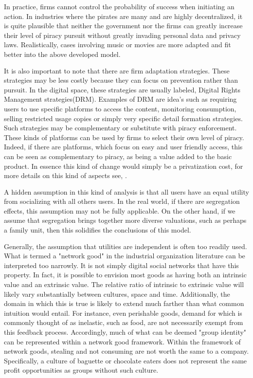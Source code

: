 In practice, firms cannot control the probability of success when initiating an action. In industries where the pirates are many and are highly decentralized, it is quite plausible that neither the government nor the firms can greatly increase their level of piracy pursuit without greatly invading personal data and privacy laws.  Realistically, cases involving music or movies are more adapted and fit better into the above developed model. 

It is also important to note that there are firm adaptation strategies. These strategies may be less costly because they can focus on prevention rather than pursuit. In the digital space, these strategies are usually labeled, Digital Rights Management strategies(DRM). Examples of DRM are idea's such as requiring users to use specific platforms to access the content, monitoring consumption, selling restricted usage copies or simply very specific detail formation strategies. Such strategies may be complementary or substitute with piracy enforcement. These kinds of platforms can be used by firms to select their own level of piracy. Indeed, if there are platforms, which focus on easy and user friendly access, this can be seen as complementary to piracy, as being a value added to the basic product. In essence this kind of change would simply be a privatization cost, for more details on this kind of aspects see,  \citep{S04}.


A hidden assumption in this kind of analysis is that all users have an equal utility from socializing with all others users. In the real world, if there are segregation effects, this assumption may not be fully applicable. On the other hand, if we assume that segregation brings together more diverse valuations, such as perhaps a family unit, then this solidifies the conclusions of this model.

Generally, the assumption that utilities are independent is often too readily used. What is termed a "network good" in the industrial organization literature can be interpreted too narrowly. It is not simply digital social networks that have this property. In fact, it is possible to envision most goods as having both an intrinsic value and an extrinsic value. The relative ratio of intrinsic to extrinsic value will likely vary substantially between cultures, space and time. Additionally, the domain in which this is true is likely to extend much farther than what common intuition would entail. For instance, even perishable goods, demand for which is commonly thought of as inelastic, such as food, are not necessarily exempt from this feedback process. Accordingly, much of what can be deemed "group identity" can be represented within a network good framework. Within the framework of network goods, stealing and not consuming are not worth the same to a company. Specifically, a culture of baguette or chocolate eaters does not represent the same profit opportunities as groups without such culture.

